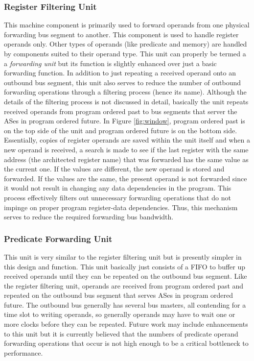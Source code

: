 %
\subsubsection{Register Filtering Unit}
%
This machine component is primarily used to forward operands
from one physical forwarding bus segment to another.
This component is used to handle register operands only.
Other types of operands (like predicate and memory) are 
handled by components
suited to their operand type.
This unit can properly be termed a 
a \textit{forwarding unit}
but its function
is slightly enhanced over just a basic forwarding function.
In addition to just repeating a received operand onto an outbound
bus segment, this unit also serves to reduce the number of outbound
forwarding operations through a filtering process (hence its name).
Although the details of the filtering process is not discussed
in detail, basically the unit repeats received operands
from program ordered past to bus segments that server the
ASes in program ordered future.
In Figure \ref{fig:window}, program ordered past is on the
top side of the unit and program ordered future is on the bottom
side.
Essentially, copies of register operands are saved 
within
the unit itself and when a new operand is received, a search is
made to see if the last register with the same address
(the architected register name) that was forwarded has the same value
as the current one.  If the values are different, the new operand
is stored and forwarded.  If the values are the same, the present
operand is not forwarded since it would not result in changing
any data dependencies in the program.  
This process effectively filters out unnecessary forwarding
operations that do not impinge on proper program register-data
dependencies.
Thus, this mechanism serves to
reduce the required forwarding bus bandwidth.
%
\subsubsection{Predicate Forwarding Unit}
%
This unit is very similar to the register filtering unit but
is presently simpler in this design and function.
This unit basically just consists of a FIFO to buffer up
received operands until they can be repeated on the outbound bus segment.
Like the register filtering unit, operands are received 
from program ordered past and repeated on the outbound bus
segment that serves ASes in program ordered future.
The outbound bus generally has several bus masters, all contending
for a time slot to writing operands, so generally operands
may have to wait one or more clocks before they can be repeated.
Future work may include enhancements to this unit but
it is currently believed that the numbers of predicate operand
forwarding operations that occur is not high enough to be
a critical bottleneck to performance.
%
